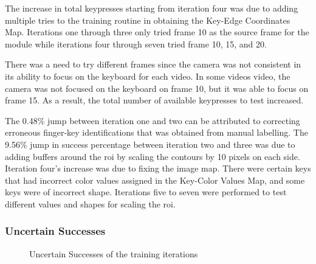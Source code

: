 \documentclass{report}
\begin{document}
The increase in total keypresses starting from iteration four was due to adding
multiple tries to the training routine in obtaining the Key-Edge Coordinates
Map. Iterations one through three only tried frame 10 as the source frame for
the module while iterations four through seven tried frame 10, 15, and 20.

There was a need to try different frames since the camera was not consistent in
its ability to focus on the keyboard for each video. In some videos video, the
camera was not focused on the keyboard on frame 10, but it was able to focus on
frame 15. As a result, the total number of available keypresses to test
increased.

The 0.48\% jump between iteration one and two can be attributed to correcting
erroneous finger-key identifications that was obtained from manual labelling.
The 9.56\% jump in success percentage between iteration two and three was due to
adding buffers around the \ac{roi} by scaling the contours by 10 pixels on each
side. Iteration four's increase was due to fixing the image map. There were
certain keys that had incorrect color values assigned in the Key-Color Values
Map, and some keys were of incorrect shape. Iterations five to seven were
performed to test different values and shapes for scaling the \ac{roi}.

\subsubsection{Uncertain Successes}

\begin{figure}[H]
	\centering
	\caption{Uncertain Successes of the training iterations}
	\label{fig:rd-training-uncertain-successes}
\end{figure}
\end{document}
